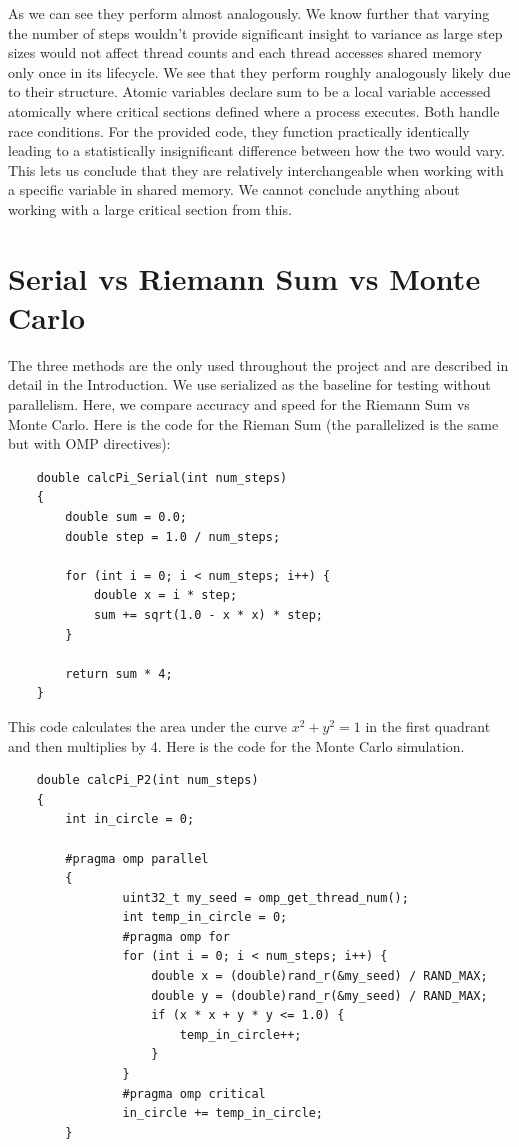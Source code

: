 \documentclass{article}
\begin{document}
\begin{multicols}{2}
As we can see they perform almost analogously. We know further that varying the number of steps wouldn't provide significant insight to variance as large step sizes would not affect thread counts and each thread accesses shared memory only once in its lifecycle. We see that they perform roughly analogously likely due to their structure. Atomic variables declare sum to be a local variable accessed atomically where critical sections defined where a process executes. Both handle race conditions. For the provided code, they function practically identically leading to a statistically insignificant difference between how the two would vary. This lets us conclude that they are relatively interchangeable when working with a specific variable in shared memory. We cannot conclude anything about working with a large critical section from this.

\section{Serial vs Riemann Sum vs Monte Carlo}
The three methods are the only used throughout the project and are described in detail in the Introduction. We use serialized as the baseline for testing without parallelism. Here, we compare accuracy and speed for the Riemann Sum vs Monte Carlo. Here is the code for the Rieman Sum (the parallelized is the same but with OMP directives):
\begin{lstlisting}
    double calcPi_Serial(int num_steps)
    {
        double sum = 0.0;
        double step = 1.0 / num_steps;
    
        for (int i = 0; i < num_steps; i++) {
            double x = i * step;
            sum += sqrt(1.0 - x * x) * step;
        }
    
        return sum * 4;
    }
\end{lstlisting}
This code calculates the area under the curve $x^2 + y^2 = 1$ in the first quadrant and then multiplies by 4.
Here is the code for the Monte Carlo simulation.
\begin{lstlisting}
    double calcPi_P2(int num_steps)
    {
        int in_circle = 0;
    
        #pragma omp parallel
        {
                uint32_t my_seed = omp_get_thread_num();
                int temp_in_circle = 0;
                #pragma omp for
                for (int i = 0; i < num_steps; i++) {
                    double x = (double)rand_r(&my_seed) / RAND_MAX;
                    double y = (double)rand_r(&my_seed) / RAND_MAX;
                    if (x * x + y * y <= 1.0) {
                        temp_in_circle++;
                    }
                }
                #pragma omp critical
                in_circle += temp_in_circle;
        }
    

\end{lstlisting}
\end{multicols}
\end{document}

